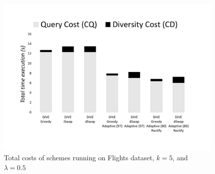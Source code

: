 \documentclass{article}
\begin{document}
\begin{figure}
	\begin{center}
			\vspace{-15pt}
		\includegraphics[width=6.5in]{figures/flight_costs_rectifying}
		\vspace{-40pt}
		\caption{Total costs of schemes running on Flights dataset, $k = 5$, and $\lambda = 0.5$ }
		\label{fig:flight_costs_all_rectifying}
		\vspace{-10pt}
	\end{center}
\end{figure}
\end{document}
